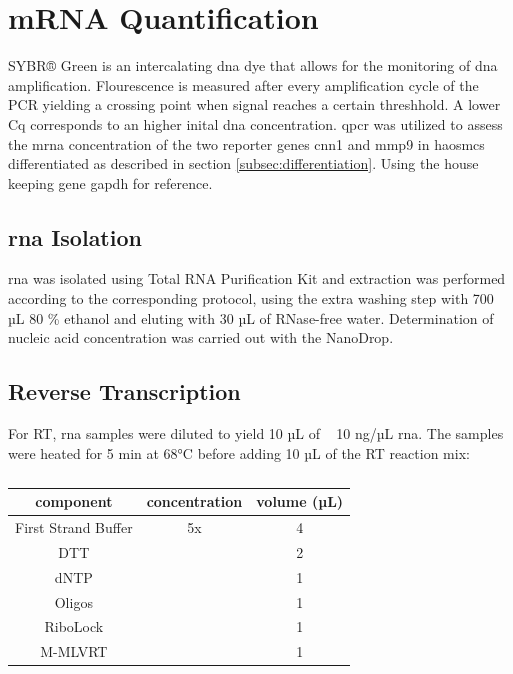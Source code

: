 \section{mRNA Quantification}
\label{sec:qpcr}
SYBR® Green is an intercalating \ac{dna} dye that allows for the monitoring of \ac{dna} amplification. Flourescence is measured after every amplification cycle of the PCR yielding a crossing point when signal reaches a certain threshhold. A lower \ac{Cq} corresponds to an higher inital \ac{dna} concentration. \cite{huggettStandardisationReportingNucleic2011}
\ac{qpcr} was utilized to assess the m\ac{rna} concentration of the two reporter genes \ac{cnn1} and \ac{mmp9} in \acp{haosmc} differentiated as described in section \ref{subsec:differentiation}. Using the house keeping gene \ac{gapdh} for reference.


    \subsection{\ac{rna} Isolation}
    \ac{rna} was isolated using Total RNA Purification Kit and extraction was performed according to the corresponding protocol, using the extra washing step with 700 µL 80 \% ethanol and eluting with 30 µL of RNase-free water. Determination of nucleic acid concentration was carried out with the NanoDrop.

    \subsection{Reverse Transcription}
    For \ac{RT}, \ac{rna} samples were diluted to yield 10 µL of ~ 10 ng/µL \ac{rna}. The samples were heated for 5 min at 68°C before adding 10 µL of the RT reaction mix:

    \begin{table}[h]
    \capstart
	\centering
	\begin{minipage}{\captionwidth}
	   	\caption[RT mastermix]{}
	   	\label{tab:RT Mastr Mix}
	\end{minipage}
    \begin{tabular}{|c|c|c|}
        \hline
        component           & concentration & volume (µL) \\ \hline
        First Strand Buffer & 5x            & 4           \\
        \acs{DTT}            &               & 2           \\
        \acs{dNTP}           &               & 1           \\
        Oligos              &               & 1           \\
        RiboLock            &               & 1           \\
        M-MLVRT             &               & 1           \\ \hline
    \end{tabular}
    \end{table}

